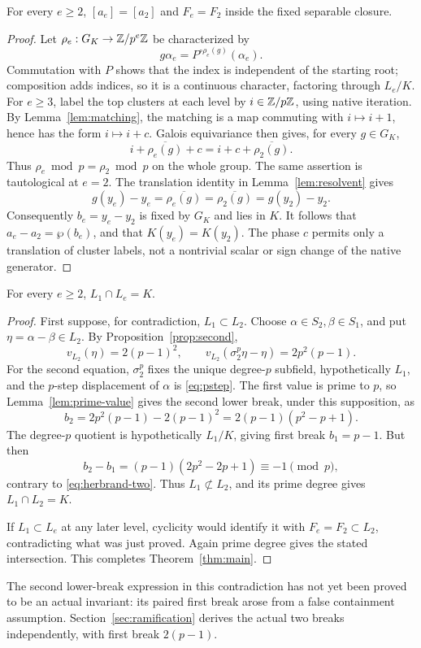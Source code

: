 \begin{proposition}\label{prop:as-stable}
For every \(e\ge2\), \([a_e]=[a_2]\) and \(F_e=F_2\)
inside the fixed separable closure.
\end{proposition}

\begin{proof}
Let \(\rho_e:G_K\to\mathbb Z/p^e\mathbb Z\) be characterized by
\[
 g\alpha_e=P^{\circ\rho_e(g)}(\alpha_e).
\]
Commutation with \(P\) shows that the index is independent of
the starting root; composition adds indices, so it is a
continuous character, factoring through \(L_e/K\).
For \(e\ge3\), label the top clusters at each level by
\(i\in\mathbb Z/p\mathbb Z\), using native iteration.
By Lemma~\ref{lem:matching}, the matching is a map commuting
with \(i\mapsto i+1\), hence has the form \(i\mapsto i+c\).
Galois equivariance then gives, for every \(g\in G_K\),
\[
 i+\overline{\rho_e(g)}+c
 =i+c+\overline{\rho_2(g)} .
\]
Thus \(\rho_e\bmod p=\rho_2\bmod p\) on the whole group.
The same assertion is tautological at \(e=2\).
The translation identity in Lemma~\ref{lem:resolvent} gives
\[
 g(y_e)-y_e=\overline{\rho_e(g)}
 =\overline{\rho_2(g)}=g(y_2)-y_2.
\]
Consequently \(b_e=y_e-y_2\) is fixed by \(G_K\) and lies
in \(K\). It follows that \(a_e-a_2=\wp(b_e)\), and that
\(K(y_e)=K(y_2)\).
The phase \(c\) permits only a translation of cluster labels,
not a nontrivial scalar or sign change of the native generator.
\end{proof}

\begin{proposition}\label{prop:separation}
For every \(e\ge2\), \(L_1\cap L_e=K\).
\end{proposition}

\begin{proof}
First suppose, for contradiction, \(L_1\subset L_2\).
Choose \(\alpha\in S_2,\beta\in S_1\), and put
\(\eta=\alpha-\beta\in L_2\).
By Proposition~\ref{prop:second},
\[
 v_{L_2}(\eta)=2(p-1)^2,\qquad
 v_{L_2}(\sigma_2^p\eta-\eta)=2p^2(p-1).
\]
For the second equation, \(\sigma_2^p\) fixes the unique
degree-\(p\) subfield, hypothetically \(L_1\), and the
\(p\)-step displacement of \(\alpha\) is \eqref{eq:pstep}.
The first value is prime to \(p\), so
Lemma~\ref{lem:prime-value} gives the second lower break,
under this supposition, as
\[
 b_2=2p^2(p-1)-2(p-1)^2
 =2(p-1)(p^2-p+1).
\]
The degree-\(p\) quotient is hypothetically \(L_1/K\), giving
first break \(b_1=p-1\). But then
\[
 b_2-b_1=(p-1)(2p^2-2p+1)\equiv-1\pmod p,
\]
contrary to \eqref{eq:herbrand-two}.
Thus \(L_1\not\subset L_2\), and its prime degree gives
\(L_1\cap L_2=K\).

If \(L_1\subset L_e\) at any later level, cyclicity would
identify it with \(F_e=F_2\subset L_2\), contradicting what
was just proved. Again prime degree gives the stated
intersection. This completes Theorem~\ref{thm:main}.
\end{proof}

The second lower-break expression in this contradiction has
not yet been proved to be an actual invariant: its paired
first break arose from a false containment assumption.
Section~\ref{sec:ramification} derives the actual two breaks
independently, with first break \(2(p-1)\).
